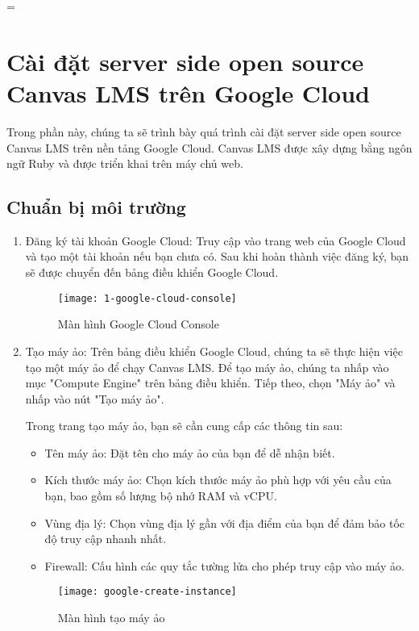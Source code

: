 =\documentclass[../Thesis.tex]{subfiles}
\begin{document}
\section{Cài đặt server side open source Canvas LMS trên Google Cloud}
    Trong phần này, chúng ta sẽ trình bày quá trình cài đặt server side open source Canvas LMS trên nền tảng Google Cloud. Canvas LMS được xây dựng bằng ngôn ngữ Ruby và được triển khai trên máy chủ web.
    \subsection{Chuẩn bị môi trường}
    \begin{enumerate}
        \item Đăng ký tài khoản Google Cloud: Truy cập vào trang web của Google Cloud và tạo một tài khoản nếu bạn chưa có. Sau khi hoàn thành việc đăng ký, bạn sẽ được chuyển đến bảng điều khiển Google Cloud.
        \begin{figure}[hbt!]
            \centering\texttt{[image: 1-google-cloud-console]}
            \caption{Màn hình Google Cloud Console}
            \label{fig:google-cloud-console}
        \end{figure}
        \FloatBarrier
        \item Tạo máy ảo: Trên bảng điều khiển Google Cloud, chúng ta sẽ thực hiện việc tạo một máy ảo để chạy Canvas LMS. Để tạo máy ảo, chúng ta nhấp vào mục "Compute Engine" trên bảng điều khiển. Tiếp theo, chọn "Máy ảo" và nhấp vào nút "Tạo máy ảo".

        Trong trang tạo máy ảo, bạn sẽ cần cung cấp các thông tin sau:
        \begin{itemize}
            \item Tên máy ảo: Đặt tên cho máy ảo của bạn để dễ nhận biết.
            \item Kích thước máy ảo: Chọn kích thước máy ảo phù hợp với yêu cầu của bạn, bao gồm số lượng bộ nhớ RAM và vCPU.
            \item Vùng địa lý: Chọn vùng địa lý gần với địa điểm của bạn để đảm bảo tốc độ truy cập nhanh nhất.
            \item Firewall: Cấu hình các quy tắc tường lửa cho phép truy cập vào máy ảo.
        \end{itemize}
        \begin{figure}[hbt!]
            \centering\texttt{[image: google-create-instance]}
            \caption{Màn hình tạo máy ảo}
            \label{fig:google-create-instance}
        \end{figure}
        \FloatBarrier


\end{enumerate}
\end{document}
